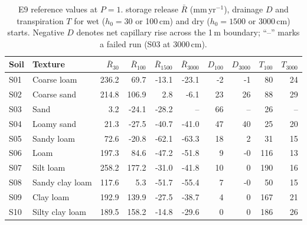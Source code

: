 \begin{table}[H]\centering\scriptsize
\caption{E9 reference values at $P=1$. storage release $\bar R$ (mm\,yr$^{-1}$), drainage $D$ and transpiration $T$ for wet ($h_0=30$ or 100\,cm) and dry ($h_0=1500$ or 3000\,cm) starts. Negative $D$ denotes net capillary rise across the 1\,m boundary; ``--'' marks a failed run (S03 at 3000\,cm).}
\label{tab:e9}
\begin{tabular}{llrrrrrrrr}
\toprule
Soil & Texture & $\bar R_{30}$ & $\bar R_{100}$ & $\bar R_{1500}$ & $\bar R_{3000}$ & $D_{100}$ & $D_{3000}$ & $T_{100}$ & $T_{3000}$\\\midrule
S01 & Coarse loam & 236.2 & 69.7 & -13.1 & -23.1 & -2 & -1 & 80 & 24\\
S02 & Coarse sand & 214.8 & 106.9 & 2.8 & -6.1 & 23 & 26 & 88 & 29\\
S03 & Sand & 3.2 & -24.1 & -28.2 & -- & 66 & -- & 26 & --\\
S04 & Loamy sand & 21.3 & -27.5 & -40.7 & -41.0 & 47 & 40 & 25 & 20\\
S05 & Sandy loam & 72.6 & -20.8 & -62.1 & -63.3 & 18 & 2 & 31 & 15\\
S06 & Loam & 197.3 & 84.6 & -47.2 & -51.8 & 9 & -0 & 116 & 13\\
S07 & Silt loam & 258.2 & 177.2 & -31.0 & -41.8 & 10 & 0 & 190 & 16\\
S08 & Sandy clay loam & 117.6 & 5.3 & -51.7 & -55.4 & 7 & -0 & 50 & 15\\
S09 & Clay loam & 192.9 & 139.9 & -27.5 & -38.7 & 4 & 0 & 167 & 21\\
S10 & Silty clay loam & 189.5 & 158.2 & -14.8 & -29.6 & 0 & 0 & 186 & 26\\
\bottomrule\end{tabular}\end{table}

